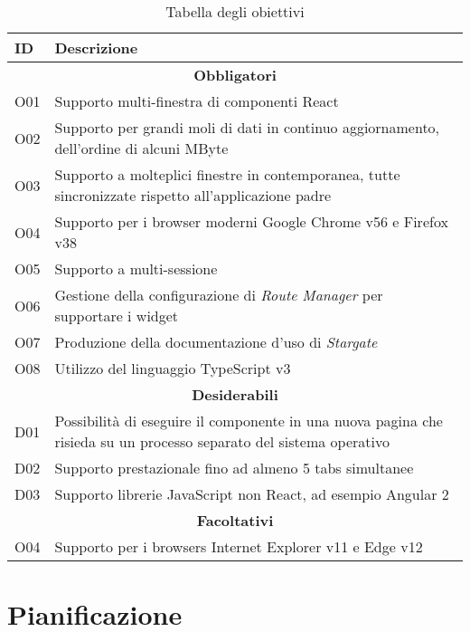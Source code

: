 \begin{table}[H]
\small
\begin{tabular}{ |p{2cm} |p{11cm}|}
\hline
\textbf{ID} & \textbf{Descrizione} \\ \hline

\multicolumn{2}{|c|}{\textbf{Obbligatori}} \\ \hline

O01 & Supporto multi-finestra di componenti React \\ \hline
O02 & Supporto per grandi moli di dati in continuo aggiornamento, dell'ordine di alcuni MByte \\ \hline
O03 & Supporto a molteplici finestre in contemporanea, tutte sincronizzate rispetto all'applicazione padre \\ \hline
O04 & Supporto per i browser moderni Google Chrome v56 e Firefox v38 \\ \hline
O05 & Supporto a multi-sessione \\ \hline
O06 & Gestione della configurazione di \textit{Route Manager} per supportare i widget \\ \hline
O07 & Produzione della documentazione d'uso di \textit{Stargate} \\ \hline
O08 & Utilizzo del linguaggio TypeScript v3 \\ \hline

\multicolumn{2}{|c|}{\textbf{Desiderabili}} \\ \hline

D01 & Possibilità di eseguire il componente in una nuova pagina che risieda su un processo separato del sistema operativo \\ \hline
D02 & Supporto prestazionale fino ad almeno 5 tabs simultanee \\ \hline
D03 & Supporto librerie JavaScript non React, ad esempio Angular 2 \\ \hline

\multicolumn{2}{|c|}{\textbf{Facoltativi}} \\ \hline

O04 & Supporto per i browsers Internet Explorer v11 e Edge v12 \\ \hline

\end{tabular}
\caption{Tabella degli obiettivi}
\end{table}

\section{Pianificazione}

